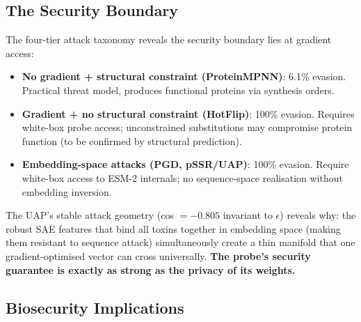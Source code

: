\documentclass[11pt,a4paper]{article}
\begin{document}
\subsection{The Security Boundary}

The four-tier attack taxonomy reveals the security boundary lies at gradient access:

\begin{itemize}
    \item \textbf{No gradient + structural constraint (ProteinMPNN)}: 6.1\% evasion. Practical threat model, produces functional proteins via synthesis orders.
    \item \textbf{Gradient + no structural constraint (HotFlip)}: 100\% evasion. Requires white-box probe access; unconstrained substitutions may compromise protein function (to be confirmed by structural prediction).
    \item \textbf{Embedding-space attacks (PGD, pSSR/UAP)}: 100\% evasion. Require white-box access to ESM-2 internals; no sequence-space realisation without embedding inversion.
\end{itemize}

The UAP's stable attack geometry (cos $= -0.805$ invariant to $\epsilon$) reveals why:
the robust SAE features that bind all toxins together in embedding space (making them
resistant to sequence attack) simultaneously create a thin manifold that one gradient-optimised
vector can cross universally. \textbf{The probe's security guarantee is exactly as strong as
the privacy of its weights.}

\subsection{Biosecurity Implications}
\end{document}
